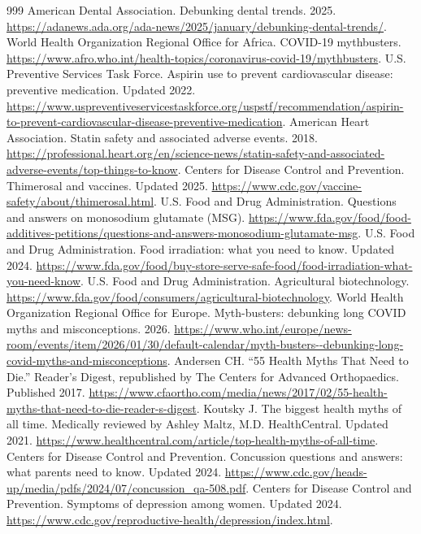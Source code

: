 \documentclass[11pt,oneside]{book}
\begin{document}
\begin{thebibliography}{999}
American Dental Association. Debunking dental trends. 2025. \url{https://adanews.ada.org/ada-news/2025/january/debunking-dental-trends/}.
World Health Organization Regional Office for Africa. COVID-19 mythbusters. \url{https://www.afro.who.int/health-topics/coronavirus-covid-19/mythbusters}.
U.S. Preventive Services Task Force. Aspirin use to prevent cardiovascular disease: preventive medication. Updated 2022. \url{https://www.uspreventiveservicestaskforce.org/uspstf/recommendation/aspirin-to-prevent-cardiovascular-disease-preventive-medication}.
American Heart Association. Statin safety and associated adverse events. 2018. \url{https://professional.heart.org/en/science-news/statin-safety-and-associated-adverse-events/top-things-to-know}.
Centers for Disease Control and Prevention. Thimerosal and vaccines. Updated 2025. \url{https://www.cdc.gov/vaccine-safety/about/thimerosal.html}.
U.S. Food and Drug Administration. Questions and answers on monosodium glutamate (MSG). \url{https://www.fda.gov/food/food-additives-petitions/questions-and-answers-monosodium-glutamate-msg}.
U.S. Food and Drug Administration. Food irradiation: what you need to know. Updated 2024. \url{https://www.fda.gov/food/buy-store-serve-safe-food/food-irradiation-what-you-need-know}.
U.S. Food and Drug Administration. Agricultural biotechnology. \url{https://www.fda.gov/food/consumers/agricultural-biotechnology}.
World Health Organization Regional Office for Europe. Myth-busters: debunking long COVID myths and misconceptions. 2026. \url{https://www.who.int/europe/news-room/events/item/2026/01/30/default-calendar/myth-busters--debunking-long-covid-myths-and-misconceptions}.
Andersen CH. ``55 Health Myths That Need to Die.'' Reader's Digest, republished by The Centers for Advanced Orthopaedics. Published 2017. \url{https://www.cfaortho.com/media/news/2017/02/55-health-myths-that-need-to-die-reader-s-digest}.
Koutsky J. The biggest health myths of all time. Medically reviewed by Ashley Maltz, M.D. HealthCentral. Updated 2021. \url{https://www.healthcentral.com/article/top-health-myths-of-all-time}.
Centers for Disease Control and Prevention. Concussion questions and answers: what parents need to know. Updated 2024. \url{https://www.cdc.gov/heads-up/media/pdfs/2024/07/concussion_qa-508.pdf}.
Centers for Disease Control and Prevention. Symptoms of depression among women. Updated 2024. \url{https://www.cdc.gov/reproductive-health/depression/index.html}.

\end{thebibliography}
\end{document}
